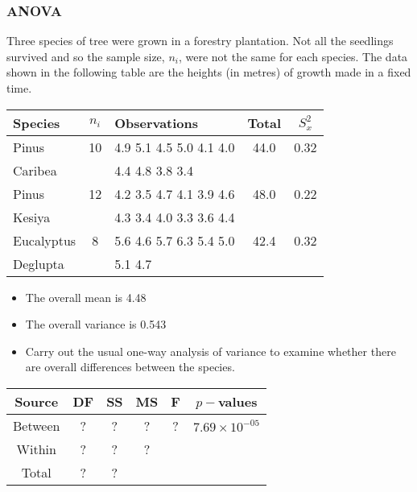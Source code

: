 \documentclass[a4paper,12pt]{article}
\begin{document}
\subsubsection*{ANOVA}
Three species of tree were grown in a forestry plantation. Not all the
seedlings survived and so the sample size, $n_i$, were not the same for
each species. The data shown in the following table are the heights (in
metres) of growth made in a fixed time.

{
\Large
\begin{centering}
	\begin{tabular}{|l|c|l|c|c|}
		\hline
Species & $n_i$ & Observations & Total & $S^2_x$ \\ \hline
Pinus & 10 & 4.9 5.1 4.5 5.0 4.1 4.0  & 44.0 & 0.32\\ 
Caribea  & & 4.4 4.8 3.8 3.4

 & &\\  \hline
Pinus  & 12 & 4.2 3.5 4.7 4.1 3.9 4.6    &  48.0 & 0.22\\ 
Kesiya & & 4.3 3.4 4.0 3.3 3.6 4.4 &&\\  \hline
Eucalyptus 
 & 8 & 5.6 4.6 5.7 6.3 5.4 5.0  & 42.4 & 0.32
  \\ 
Deglupta & & 5.1 4.7
 &&\\  \hline
	\end{tabular} 
\end{centering}
}

\begin{itemize}
	\item The overall mean is 4.48
	\item The overall variance is 0.543
\end{itemize}

\begin{itemize}
\item Carry out the usual one-way analysis of variance to examine whether
there are overall differences between the species. 
\end{itemize}
{
	\large
\begin{tabular}{|c|c|c|c|c|c|}
	\hline Source & DF & SS & MS & F & $p-$values \\ \hline
	\hline Between & \phantom{ma} ? \phantom{ma} & \phantom{mak} ? \phantom{mak} & \phantom{mak} ? \phantom{mak} & \phantom{mak} ? \phantom{mak} &  $7.69\times10^{-05}$ 	  \\ 
	\hline Within & \phantom{ma} ? \phantom{ma} &  \phantom{mak} ? \phantom{mak} &  \phantom{mak} ? \phantom{mak}&  \phantom{mak}&  \\ \hline
	\hline  Total & \phantom{ma} ? \phantom{ma} & \phantom{mak} ? \phantom{mak} &  &  &   \\ 
	\hline 
\end{tabular} 
}
	\newpage
\end{document}
